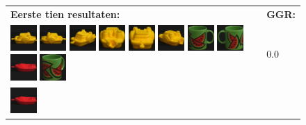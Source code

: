 {\begin{figure}[p]
\vspace{5pt}
\centering
\begin{tabular}{m{11cm} | m{3cm} |}
\textbf{Eerste tien resultaten:} & \textbf{GGR:} \\
\vspace{4pt}
\includegraphics[width=1cm]{coil/beeld-12.eps}
\includegraphics[width=1cm]{coil/beeld-13.eps}
\includegraphics[width=1cm]{coil/beeld-15.eps}
\includegraphics[width=1cm]{coil/beeld-17.eps}
\includegraphics[width=1cm]{coil/beeld-14.eps}
\includegraphics[width=1cm]{coil/beeld-16.eps}
\includegraphics[width=1cm]{coil/beeld-30.eps}
\includegraphics[width=1cm]{coil/beeld-31.eps}
\includegraphics[width=1cm]{coil/beeld-18.eps}
\includegraphics[width=1cm]{coil/beeld-33.eps}
& {\scriptsize 0.0}
\\
\includegraphics[width=1cm]{coil/beeld-18.eps}

\end{tabular}
\end{figure}}
